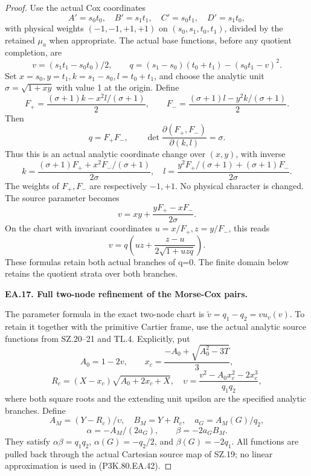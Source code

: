 \begin{proof}
Use the actual Cox coordinates
\[
 A'=s_0t_0,\quad B'=s_1t_1,\quad C'=s_0t_1,\quad D'=s_1t_0,
\]
with physical weights \((-1,-1,+1,+1)\) on
\((s_0,s_1,t_0,t_1)\), divided by the retained \(\mu_a\) when appropriate.
The actual base functions, before any quotient completion, are
\[
 v=(s_1t_1-s_0t_0)/2,\qquad
 q=(s_1-s_0)(t_0+t_1)-(s_0t_1-v)^2.
\]
Set \(x=s_0,y=t_1,k=s_1-s_0,l=t_0+t_1\), and choose the analytic unit
\(\sigma=\sqrt{1+xy}\) with value 1 at the origin. Define
\[
 F_+=\frac{(\sigma+1)k-x^2l/(\sigma+1)}2,\qquad
 F_-=\frac{(\sigma+1)l-y^2k/(\sigma+1)}2.
\]
Then
\[
 q=F_+F_-,\qquad
 \det\frac{\partial(F_+,F_-)}{\partial(k,l)}=\sigma.
\]
Thus this is an actual analytic coordinate change over \((x,y)\), with inverse
\[
 k=\frac{(\sigma+1)F_++x^2F_-/(\sigma+1)}{2\sigma},\quad
 l=\frac{y^2F_+/(\sigma+1)+(\sigma+1)F_-}{2\sigma}.
\]
The weights of \(F_+,F_-\) are respectively \(-1,+1\). No physical
character is changed. The source parameter becomes
\[
 v=xy+\frac{yF_+-xF_-}{2\sigma}.
\]
On the chart with invariant coordinates \(u=x/F_+,z=y/F_-\), this reads
\[
 v=q\left(uz+\frac{z-u}{2\sqrt{1+uzq}}\right).
\]
These formulas retain both actual branches of q=0. The finite domain below retains the quotient strata over both branches.

\par\medskip\noindent\textbf{EA.17. Full two-node refinement of the Morse-Cox pairs.}\par\nopagebreak[4]

The parameter formula in the exact two-node chart is
\(\widetilde v=q_1-q_2=v u_v(v)\). To retain it together with
the primitive Cartier frame, use the actual analytic source
functions from SZ.20--21 and TL.4. Explicitly, put
\[
 A_0=1-2v,\qquad x_c=\frac{-A_0+\sqrt{A_0^2-3T}}3,
\]
\[
 R_c=(X-x_c)\sqrt{A_0+2x_c+X},\quad
 \upsilon=\frac{v^2-A_0x_c^2-2x_c^3}{q_1q_2},
\]
where both square roots and the extending unit upsilon are the
specified analytic branches. Define
\[
 A_M=(Y-R_c)/\upsilon,\quad B_M=Y+R_c,\quad
 a_G=A_M(G)/q_2,
\]
\[
             \alpha=-A_M/(2a_G),\qquad
             \beta=-2a_GB_M.
 \tag{P3K.80.EA.42}
\]
They satisfy \(\alpha\beta=q_1q_2\),
\(\alpha(G)=-q_2/2\), and \(\beta(G)=-2q_1\).
All functions are pulled back through the actual Cartesian source
map of SZ.19; no linear approximation is used in (P3K.80.EA.42).


\end{proof}
